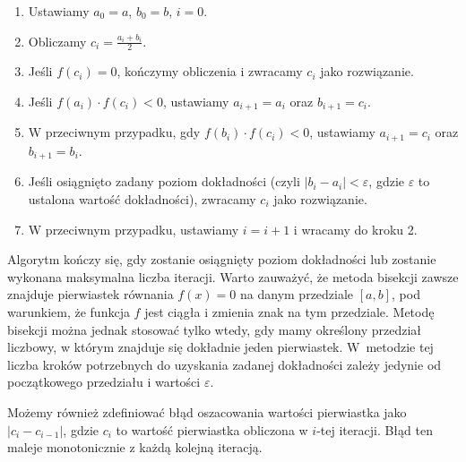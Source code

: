 \documentclass[12pt]{article}
\begin{document}
\begin{enumerate}
\item Ustawiamy $a_0 = a$, $b_0 = b$, $i = 0$.
\item Obliczamy $c_i = \frac{a_i + b_i}{2}$.
\item Jeśli $f(c_i) = 0$, kończymy obliczenia i zwracamy $c_i$ jako rozwiązanie.
\item Jeśli $f(a_i) \cdot f(c_i) < 0$, ustawiamy $a_{i+1} = a_i$ oraz $b_{i+1} = c_i$.
\item W przeciwnym przypadku, gdy $f(b_i) \cdot f(c_i) < 0$, ustawiamy $a_{i+1} = c_i$ oraz $b_{i+1} = b_i$.
\item Jeśli osiągnięto zadany poziom dokładności (czyli $|b_i - a_i| < \varepsilon$, gdzie $\varepsilon$ to ustalona wartość dokładności), zwracamy $c_i$ jako rozwiązanie.
\item W przeciwnym przypadku, ustawiamy $i = i + 1$ i wracamy do kroku 2.
\end{enumerate}

Algorytm kończy się, gdy zostanie osiągnięty poziom dokładności lub zostanie wykonana maksymalna liczba iteracji. Warto zauważyć, że metoda bisekcji zawsze znajduje pierwiastek równania $f(x) = 0$ na danym przedziale $[a,b]$, pod warunkiem, że funkcja $f$ jest ciągła i zmienia znak na tym przedziale. Metodę bisekcji można jednak stosować tylko wtedy, gdy mamy określony przedział liczbowy, w którym znajduje się dokładnie jeden pierwiastek. W~metodzie tej liczba kroków potrzebnych do uzyskania zadanej dokładności zależy jedynie od początkowego przedziału i wartości $\varepsilon$.

Możemy również zdefiniować błąd oszacowania wartości pierwiastka jako $|c_i - c_{i-1}|$, gdzie $c_i$ to wartość pierwiastka obliczona w $i$-tej iteracji. Błąd ten maleje monotonicznie z każdą kolejną iteracją.
\end{document}
